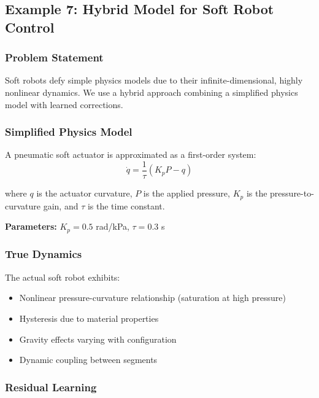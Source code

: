 \subsection{Example 7: Hybrid Model for Soft Robot Control}
\label{ex:soft_robot}

\subsubsection{Problem Statement}

Soft robots defy simple physics models due to their infinite-dimensional, highly nonlinear dynamics. We use a hybrid approach combining a simplified physics model with learned corrections.

\subsubsection{Simplified Physics Model}

A pneumatic soft actuator is approximated as a first-order system:
\begin{equation}
\dot{q} = \frac{1}{\tau}(K_p P - q)
\end{equation}

where $q$ is the actuator curvature, $P$ is the applied pressure, $K_p$ is the pressure-to-curvature gain, and $\tau$ is the time constant.

\textbf{Parameters:} $K_p = 0.5$ rad/kPa, $\tau = 0.3$ s

\subsubsection{True Dynamics}

The actual soft robot exhibits:
\begin{itemize}
    \item Nonlinear pressure-curvature relationship (saturation at high pressure)
    \item Hysteresis due to material properties
    \item Gravity effects varying with configuration
    \item Dynamic coupling between segments
\end{itemize}

\subsubsection{Residual Learning}


